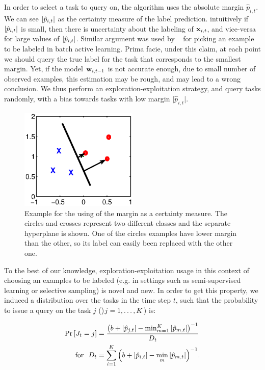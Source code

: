 In order to select a task to query on, the algorithm uses the absolute margin
$\hat{p}_{i,t}$. We can see $\left\vert{\hat{p}_{i,t}}\right\vert$ as the certainty measure of the label prediction.
 intuitively if $\left\vert{\hat{p}_{i,t}}\right\vert$ is small,
then there is uncertainty about the labeling of $\mathbf{x}_{i,t}$, and vice-versa for 
large values of $\left\vert{\hat{p}_{i,t}}\right\vert$. 
Similar argument was used by ~\cite{DBLP:conf/icml/TongK00} for picking an example to be labeled in 
batch active learning. Prima facie, under this claim, at each point we should query the true label for the task
 that corresponds to the smallest margin.  Yet, if the model $\mathbf{w}_{i,t-1}$ is not accurate enough, due to
 small number of observed examples, this estimation may be rough, and may lead to a wrong
conclusion. We thus perform an exploration-exploitation strategy, and
query tasks randomly, with a bias towards tasks with low margin
$\vert \hat{p}_{i,t} \vert$. 

\begin{figure}[h]
\begin{centering}
\includegraphics[width=0.5\textwidth]{figs/margin.eps}
\caption{Example for the using of the margin as a certainty measure. 
The circles and crosses represent two different classes and the separate hyperplane is shown. 
One of the circles examples have lower margin than the other, so its label can easily been replaced 
with the other one.}
\label{fig:margin}
\end{centering}
\end{figure}


To the best of our knowledge,
exploration-exploitation usage in this context of choosing an examples
to be labeled (e.g. in settings such as semi-supervised learning or
selective sampling) is novel and new.  In order to get this property, we induced a
distribution over the tasks in the time step $t$, such that the probability to issue a query on the task 
$j$ ()$j=1 , \ldots , K$) is:

\begin{equation}
\begin{aligned}
{\rm Pr}\left[{J_t=j}\right]&=\frac{\left({b+\left\vert{\hat{p}_{j,t}}\right\vert-\min_{m=1}^K\left\vert{\hat{p}_{m,t}}\right\vert}\right)^{-1}}{D_t}\\
~ \textrm { for } ~
D_{t}&=\sum_{i=1}^{K}{\left({b+\left\vert{\hat{p}_{i,t}}\right\vert-\min_{m}\left\vert{\hat{p}_{m,t}}\right\vert}\right)^{-1}}.
\label{eq:prob}
\end{aligned}
\end{equation} 

